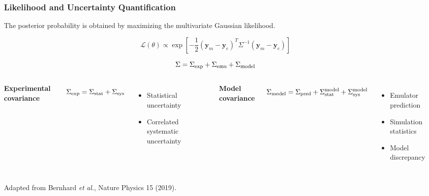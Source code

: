 \begin{frame}
\frametitle{Likelihood and Uncertainty Quantification}

\small

The posterior probability is obtained by maximizing the multivariate Gaussian likelihood.

\vspace{0.2cm}

\[
\mathcal{L}(\theta)
\propto
\exp\!\left[
-\frac12
(\mathbf y_m-\mathbf y_e)^T
\Sigma^{-1}
(\mathbf y_m-\mathbf y_e)
\right]
\]

\vspace{-0.1cm}

\[
\Sigma=\Sigma_{\rm exp}+\Sigma_{\rm emu}+\Sigma_{\rm model}
\]

\vspace{0.3cm}

\begin{columns}[T]


\textbf{Experimental covariance}

\[
\Sigma_{\rm exp}
=
\Sigma_{\rm stat}
+
\Sigma_{\rm sys}
\]

\begin{itemize}
\item Statistical uncertainty
\item Correlated systematic uncertainty
\end{itemize}


\textbf{Model covariance}

\[
\Sigma_{\rm model}
=
\Sigma_{\rm pred}
+
\Sigma_{\rm stat}^{\rm model}
+
\Sigma_{\rm sys}^{\rm model}
\]

\begin{itemize}
\item Emulator prediction
\item Simulation statistics
\item Model discrepancy
\end{itemize}

\end{columns}

\vfill

{\tiny
Adapted from Bernhard \emph{et al.},
Nature Physics 15 (2019).
}

\end{frame}


